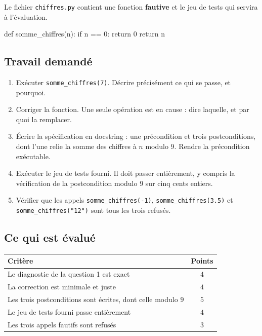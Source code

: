 Le fichier \lstinline{chiffres.py} contient une fonction \textbf{fautive} et le
jeu de tests qui servira à l'évaluation.

\begin{python}
def somme_chiffres(n):
    if n == 0:
        return 0
    return n %
\end{python}

\subsection*{Travail demandé}

\begin{enumerate}
  \item Exécuter \lstinline{somme_chiffres(7)}. Décrire précisément ce qui se
    passe, et pourquoi.

  \item Corriger la fonction. Une seule opération est en cause : dire laquelle,
    et par quoi la remplacer.

  \item Écrire la spécification en docstring : une précondition et trois
    postconditions, dont l'une relie la somme des chiffres à $n$ modulo $9$.
    Rendre la précondition exécutable.

  \item Exécuter le jeu de tests fourni. Il doit passer entièrement, y compris
    la vérification de la postcondition modulo $9$ sur cinq cents entiers.

  \item Vérifier que les appels \lstinline{somme_chiffres(-1)},
    \lstinline{somme_chiffres(3.5)} et \lstinline{somme_chiffres("12")} sont
    tous les trois refusés.
\end{enumerate}

\subsection*{Ce qui est évalué}

\begin{center}
\begin{tabular}{|l|c|}
\hline
\textbf{Critère} & \textbf{Points} \\
\hline
Le diagnostic de la question 1 est exact & $4$ \\
\hline
La correction est minimale et juste & $4$ \\
\hline
Les trois postconditions sont écrites, dont celle modulo $9$ & $5$ \\
\hline
Le jeu de tests fourni passe entièrement & $4$ \\
\hline
Les trois appels fautifs sont refusés & $3$ \\
\hline
\end{tabular}
\end{center}

